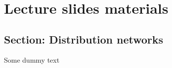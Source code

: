 
\section{Lecture slides materials}

\subsection{Section: Distribution networks}   
 
Some dummy text 
%
%
%
%
%
%
%
%
%
%
%
%
%
%
